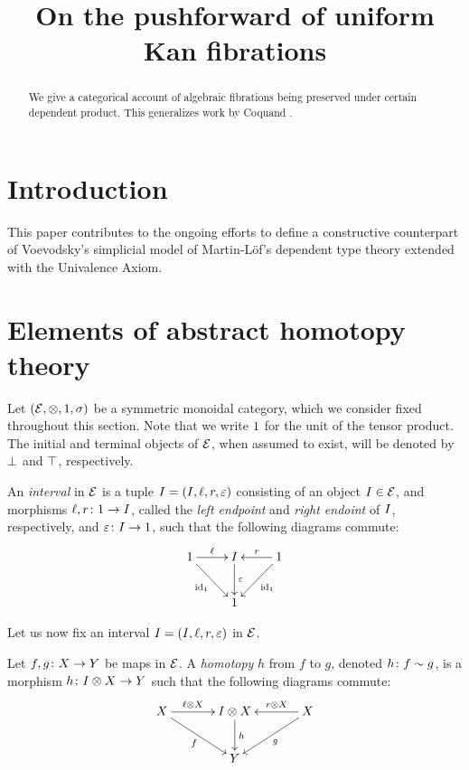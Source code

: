 \documentclass[reqno,10pt,a4paper,oneside]{amsart}
\title{On the pushforward of uniform Kan fibrations}
\begin{document}
\begin{abstract}
We give a categorical account of algebraic fibrations being preserved under certain dependent product.
This generalizes work by Coquand \etal.
\end{abstract}

\maketitle

\tableofcontents


\section{Introduction}

This paper contributes to the ongoing efforts to define a constructive counterpart of Voevodsky's 
simplicial model of Martin-L\"of's dependent type theory extended with the Univalence Axiom. 

\newpage


\section{Elements of abstract homotopy theory} 

Let $(\mathcal{E}, \otimes, 1, \sigma)$ be a symmetric monoidal category, which we consider fixed throughout this section. 
Note that we write $1$ for the unit of the tensor product. The initial and terminal objects of $\mathcal{E}$, when assumed to exist, will be denoted by $\bot$ and $\top$, respectively.


\begin{definition} An \emph{interval} in $\mathcal{E}$ is a tuple $I = (I, \ell, r, \varepsilon)$ consisting of  an object $I \in \mathcal{E}$, 
and morphisms $\ell, r \colon 1 \to I$, called the \emph{left endpoint} and
\emph{right endoint} of $I$, respectively, 
 and $\varepsilon \colon I \to 1$,   such that the following diagrams commute:
\[
\xymatrix{
\unit \ar[r]^\intervall \ar[dr]_{\id_\unit} & \interval \ar[d]^-{\varepsilon} & \unit \ar[dl]^{\id_\unit} \ar[l]_{\intervalr}  \\
 & \unit & }
 \]
\end{definition}

Let us now fix an interval $I = (I,  \ell, r, \varepsilon)$ in $\mathcal{E}$. 


\begin{definition}
\label{def:homotopy}
Let $f, g \colon X \to Y$ be maps in $\mathcal{E}$. A \emph{homotopy} $h$ from $f$ to $g$, denoted $h \colon f \sim g$, is a morphism $h \colon I \otimes X \to Y$ such that the following diagrams commute:
\[
\xymatrix@C=1.2cm{
X \ar[r]^-{\intervall \otimes X} \ar[dr]_{f} & \interval \otimes X \ar[d]^{h} & X \ar[dl]^{g} \ar[l]_-{\intervalr \otimes X}  \\
 & Y & }
 \]
\end{definition}
\end{document}
